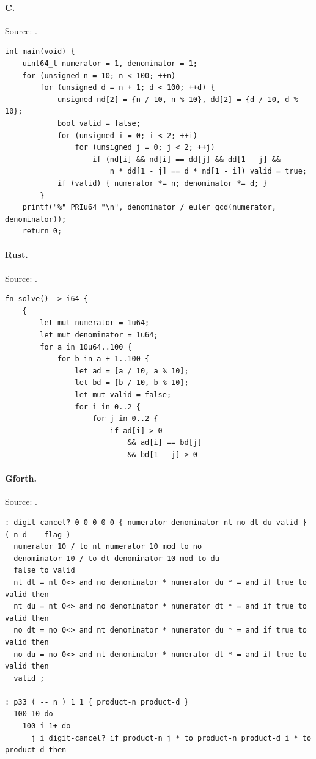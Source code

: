 \paragraph{C.} Source: .
\begin{lstlisting}
int main(void) {
    uint64_t numerator = 1, denominator = 1;
    for (unsigned n = 10; n < 100; ++n)
        for (unsigned d = n + 1; d < 100; ++d) {
            unsigned nd[2] = {n / 10, n % 10}, dd[2] = {d / 10, d % 10};
            bool valid = false;
            for (unsigned i = 0; i < 2; ++i)
                for (unsigned j = 0; j < 2; ++j)
                    if (nd[i] && nd[i] == dd[j] && dd[1 - j] &&
                        n * dd[1 - j] == d * nd[1 - i]) valid = true;
            if (valid) { numerator *= n; denominator *= d; }
        }
    printf("%" PRIu64 "\n", denominator / euler_gcd(numerator, denominator));
    return 0;
\end{lstlisting}

\paragraph{Rust.} Source: .
\begin{lstlisting}
fn solve() -> i64 {
    {
        let mut numerator = 1u64;
        let mut denominator = 1u64;
        for a in 10u64..100 {
            for b in a + 1..100 {
                let ad = [a / 10, a % 10];
                let bd = [b / 10, b % 10];
                let mut valid = false;
                for i in 0..2 {
                    for j in 0..2 {
                        if ad[i] > 0
                            && ad[i] == bd[j]
                            && bd[1 - j] > 0
\end{lstlisting}

\paragraph{Gforth.} Source: .
\begin{lstlisting}
: digit-cancel? 0 0 0 0 0 { numerator denominator nt no dt du valid } ( n d -- flag )
  numerator 10 / to nt numerator 10 mod to no
  denominator 10 / to dt denominator 10 mod to du
  false to valid
  nt dt = nt 0<> and no denominator * numerator du * = and if true to valid then
  nt du = nt 0<> and no denominator * numerator dt * = and if true to valid then
  no dt = no 0<> and nt denominator * numerator du * = and if true to valid then
  no du = no 0<> and nt denominator * numerator dt * = and if true to valid then
  valid ;

: p33 ( -- n ) 1 1 { product-n product-d }
  100 10 do
    100 i 1+ do
      j i digit-cancel? if product-n j * to product-n product-d i * to product-d then
\end{lstlisting}

